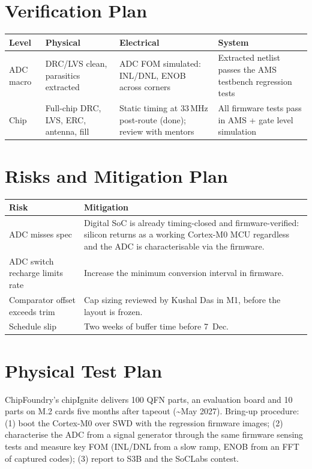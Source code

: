 \documentclass[10pt,a4paper]{article}
\renewcommand{\normalsize}{\fontsize{9.4}{11.3}\selectfont}
\renewcommand{\small}{\fontsize{8.6}{10.3}\selectfont}
\begin{document}
\section{Verification Plan}
\small
\begin{tabularx}{\textwidth}{@{}l X X X@{}}
\toprule
\textbf{Level} & \textbf{Physical} & \textbf{Electrical} & \textbf{System} \\
\midrule
ADC macro & DRC/LVS clean, parasitics extracted & ADC FOM simulated: INL/DNL, ENOB across corners & Extracted netlist passes the AMS testbench regression tests\\
Chip & Full-chip DRC, LVS, ERC, antenna, fill & Static timing at 33\,MHz post-route (done); review with mentors & All firmware tests pass in AMS + gate level simulation \\
\bottomrule
\end{tabularx}
\normalsize

\section{Risks and Mitigation Plan}
\small
\begin{tabularx}{\textwidth}{@{}l X@{}}
\toprule
\textbf{Risk} & \textbf{Mitigation} \\
\midrule
ADC misses spec & Digital SoC is already timing-closed and firmware-verified: silicon returns as a working Cortex-M0 MCU regardless and the ADC is characterisable via the firmware. \\
ADC switch recharge limits rate & Increase the minimum conversion interval in firmware. \\
Comparator offset exceeds trim & Cap sizing reviewed by Kushal Das in M1, before the layout is frozen. \\
Schedule slip & Two weeks of buffer time before 7~Dec. \\
\bottomrule
\end{tabularx}
\normalsize

\section{Physical Test Plan}
\small ChipFoundry's chipIgnite delivers 100 QFN parts, an evaluation board and 10 parts on M.2 cards five months after tapeout (\textasciitilde May 2027). Bring-up procedure: (1) boot the Cortex-M0 over SWD with the regression firmware images; (2) characterise the ADC from a signal generator through the same firmware sensing tests and measure key FOM (INL/DNL from a slow ramp, ENOB from an FFT of captured codes); (3) report to S3B and the SoCLabs contest.
\end{document}

